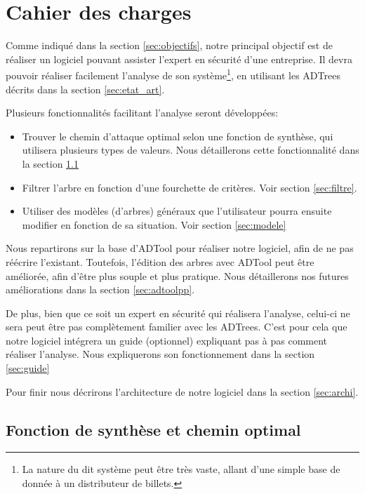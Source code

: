 \section{Cahier des charges}
    \label{sec:cahier}


    Comme indiqué dans la section \ref{sec:objectifs}, notre principal objectif est de réaliser un logiciel pouvant assister l'expert en sécurité d'une entreprise. Il devra pouvoir réaliser facilement l'analyse de son système\footnote{La nature du dit système peut être très vaste, allant d'une simple base de donnée à un distributeur de billets.}, en utilisant les ADTrees décrits dans la section \ref{sec:etat_art}.

    Plusieurs fonctionnalités facilitant l'analyse seront développées:
    \begin{itemize}
        \item Trouver le chemin d'attaque optimal selon une fonction de synthèse, qui utilisera plusieurs types de valeurs. Nous détaillerons cette fonctionnalité dans la section \ref{sec:fct_synth}
        \item Filtrer l'arbre en fonction d'une fourchette de critères. Voir section \ref{sec:filtre}.
        \item Utiliser des modèles (d'arbres) généraux que l'utilisateur pourra ensuite modifier en fonction de sa situation. Voir section \ref{sec:modele}
    \end{itemize}

    Nous repartirons sur la base d'ADTool pour réaliser notre logiciel, afin de ne pas réécrire l'existant. Toutefois, l'édition des arbres avec ADTool peut être améliorée, afin d'être plus souple et plus pratique. Nous détaillerons nos futures améliorations dans la section \ref{sec:adtoolpp}.

    De plus, bien que ce soit un expert en sécurité qui réalisera l'analyse, celui-ci ne sera peut être pas complètement familier avec les ADTrees. C'est pour cela que notre logiciel intégrera un guide (optionnel) expliquant pas à pas comment réaliser l'analyse. Nous expliquerons son fonctionnement dans la section \ref{sec:guide}

    Pour finir nous décrirons l'architecture de notre logiciel dans la section \ref{sec:archi}.

    \subsection{Fonction de synthèse et chemin optimal}
        \label{sec:fct_synth}

